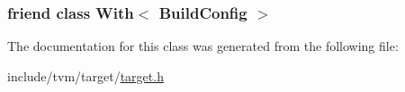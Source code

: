 \subsubsection[{\texorpdfstring{With$<$ Build\+Config $>$}{With< BuildConfig >}}]{\setlength{\rightskip}{0pt plus 5cm}friend class {\bf With}$<$ {\bf Build\+Config} $>$\hspace{0.3cm}{\ttfamily [friend]}}\hypertarget{classtvm_1_1BuildConfig_abef0c5d8f6549fa44cbedd7d0ceb72e5}{}\label{classtvm_1_1BuildConfig_abef0c5d8f6549fa44cbedd7d0ceb72e5}


The documentation for this class was generated from the following file\+:\begin{DoxyCompactItemize}
\item 
include/tvm/target/\hyperlink{target_8h}{target.\+h}\end{DoxyCompactItemize}
